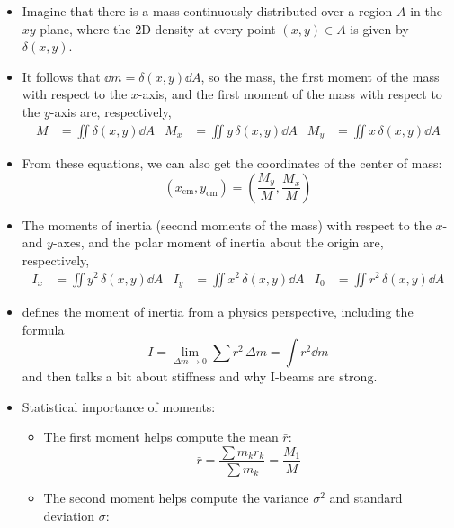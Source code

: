 \documentclass[../main.tex]{subfiles}
\begin{document}
\begin{itemize}
    \item Imagine that there is a mass continuously distributed over a region $A$ in the $xy$-plane, where the 2D density at every point $(x,y)\in A$ is given by $\delta(x,y)$.
    \item It follows that $\dd{m}=\delta(x,y)\dd{A}$, so the mass, the first moment of the mass with respect to the $x$-axis, and the first moment of the mass with respect to the $y$-axis are, respectively,
    \begin{align*}
        M &= \iint\delta(x,y)\dd{A}&
            M_x &= \iint y\, \delta(x,y)\dd{A}&
                M_y &= \iint x\, \delta(x,y)\dd{A}
    \end{align*}
    \item From these equations, we can also get the coordinates of the center of mass:
    \begin{equation*}
        (x_\text{cm},y_\text{cm}) = \left( \frac{M_y}{M},\frac{M_x}{M} \right)
    \end{equation*}
    \item The moments of inertia (second moments of the mass) with respect to the $x$- and $y$-axes, and the polar moment of inertia about the origin are, respectively,
    \begin{align*}
        I_x &= \iint y^2\, \delta(x,y)\dd{A}&
            I_y &= \iint x^2\, \delta(x,y)\dd{A}&
                I_0 &= \iint r^2\, \delta(x,y)\dd{A}
    \end{align*}
    \item \cite{bib:Thomas} defines the moment of inertia from a physics perspective, including the formula
    \begin{equation*}
        I = \lim_{\Delta m\to 0}\sum r^2\, \Delta m = \int r^2\dd{m}
    \end{equation*}
    and then talks a bit about stiffness and why I-beams are strong.
    \item Statistical importance of moments:
    \begin{itemize}
        \item The first moment helps compute the mean $\bar{r}$:
        \begin{equation*}
            \bar{r} = \frac{\sum m_kr_k}{\sum m_k} = \frac{M_1}{M}
        \end{equation*}
        \item The second moment helps compute the variance $\sigma^2$ and standard deviation $\sigma$:
        \begin{equation*}

\end{equation*}
\end{itemize}
\end{itemize}
\end{document}
